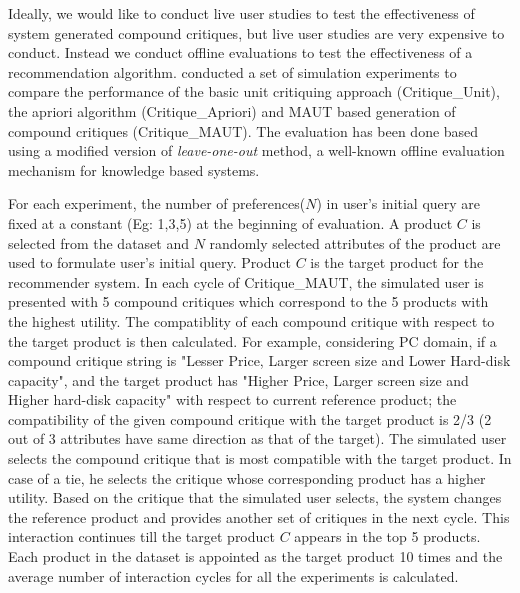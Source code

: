 Ideally, we would like to conduct live user studies to test the effectiveness of system generated compound critiques, but live user studies are very expensive to conduct.
Instead we conduct offline evaluations to test the effectiveness of a recommendation algorithm.
\cite{mautPaper} conducted a set of simulation experiments to compare the performance of the basic unit critiquing approach (Critique\_Unit), the apriori algorithm (Critique\_Apriori) and MAUT based generation of compound critiques (Critique\_MAUT).
The evaluation has been done based using a modified version of \textit{leave-one-out} method, a well-known offline evaluation mechanism for knowledge based systems.

For each experiment, the number of preferences($N$) in user's initial query are fixed at a constant (Eg: 1,3,5) at the beginning of evaluation.
A product $C$ is selected from the dataset and $N$ randomly selected attributes of the product are used to formulate user's initial query.
Product $C$ is the target product for the recommender system.
In each cycle of Critique\_MAUT, the simulated user is presented with 5 compound critiques which correspond to the 5 products with the highest utility.
The compatiblity of each compound critique with respect to the target product is then calculated.
For example, considering PC domain, if a compound critique string is "Lesser Price, Larger screen size and Lower Hard-disk capacity", and the target product has "Higher Price, Larger screen size and Higher hard-disk capacity" with respect to current reference product; the compatibility of the given compound critique with the target product is 2/3 (2 out of 3 attributes have same direction as that of the target).
The simulated user selects the compound critique that is most compatible with the target product.
In case of a tie, he selects the critique whose corresponding product has a higher utility.
Based on the critique that the simulated user selects, the system changes the reference product and provides another set of critiques in the next cycle.
This interaction continues till the target product $C$ appears in the top 5 products.
Each product in the dataset is appointed as the target product 10 times and the average number of interaction cycles for all the experiments is calculated.



